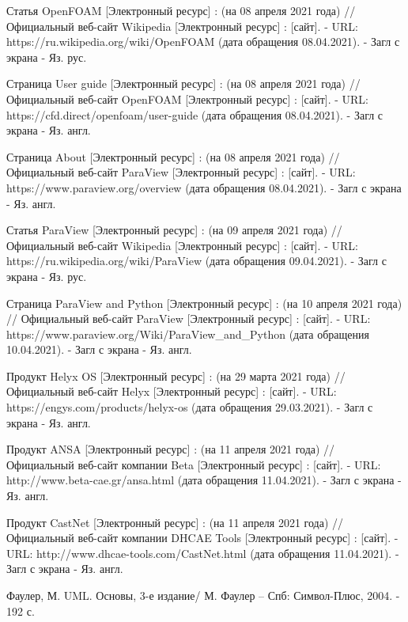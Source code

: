 \documentclass[14pt]{extreport}
\begin{document}
\begin{thebibliography}{9}

   Статья OpenFOAM [Электронный ресурс] : (на 08 апреля 2021 года) // Официальный веб-сайт Wikipedia [Электронный ресурс] : [сайт]. - URL: https://ru.wikipedia.org/wiki/OpenFOAM (дата обращения 08.04.2021). - Загл с экрана - Яз. рус.
   
   Страница User guide [Электронный ресурс] : (на 08 апреля 2021 года) // Официальный веб-сайт OpenFOAM [Электронный ресурс] : [сайт]. - URL: https://cfd.direct/openfoam/user-guide (дата обращения 08.04.2021). - Загл с экрана - Яз. англ.
   
   Страница About [Электронный ресурс] : (на 08 апреля 2021 года) // Официальный веб-сайт ParaView [Электронный ресурс] : [сайт]. - URL: https://www.paraview.org/overview (дата обращения 08.04.2021). - Загл с экрана - Яз. англ.
   
   Статья ParaView [Электронный ресурс] : (на 09 апреля 2021 года) // Официальный веб-сайт Wikipedia [Электронный ресурс] : [сайт]. - URL: https://ru.wikipedia.org/wiki/ParaView (дата обращения 09.04.2021). - Загл с экрана - Яз. рус.
   


   Страница ParaView and Python [Электронный ресурс] : (на 10 апреля 2021 года) // Официальный веб-сайт ParaView [Электронный ресурс] : [сайт]. - URL: https://www.paraview.org/Wiki/ParaView\_and\_Python (дата обращения 10.04.2021). - Загл с экрана - Яз. англ.
  
   Продукт Helyx OS [Электронный ресурс] : (на 29 марта 2021 года) // Официальный веб-сайт Helyx [Электронный ресурс] : [сайт]. - URL: https://engys.com/products/helyx-os (дата обращения 29.03.2021). - Загл с экрана - Яз. англ.
      
   Продукт ANSA [Электронный ресурс] : (на 11 апреля 2021 года) // Официальный веб-сайт компании Beta [Электронный ресурс] : [сайт]. - URL: http://www.beta-cae.gr/ansa.html (дата обращения 11.04.2021). - Загл с экрана - Яз. англ.
   
   Продукт CastNet [Электронный ресурс] : (на 11 апреля 2021 года) // Официальный веб-сайт компании DHCAE Tools [Электронный ресурс] : [сайт]. - URL: http://www.dhcae-tools.com/CastNet.html (дата обращения 11.04.2021). - Загл с экрана - Яз. англ.  

  Фаулер, М. UML. Основы, 3-е издание/ М. Фаулер -- Спб: Символ-Плюс, 2004. - 192 с.
  

\end{thebibliography}
\end{document}
